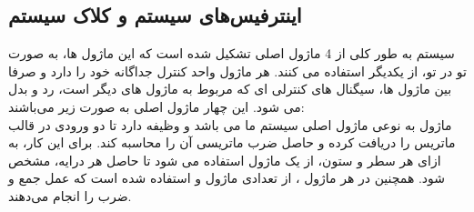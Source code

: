 \documentclass[12pt,titlepage,a4page , tikz , multi,table , svgnames,xcdraw]{article}
\begin{document}
\subsection{اینترفیس‌های سیستم و کلاک سیستم}
سیستم به طور کلی از 4 ماژول اصلی تشکیل شده است که این ماژول ها، به صورت تو در تو، از یکدیگر استفاده می کنند. هر ماژول واحد کنترل جداگانه خود را دارد و صرفا بین ماژول ها، سیگنال های کنترلی ای که مربوط به ماژول های دیگر است، رد و بدل می شود. این چهار ماژول اصلی به صورت زیر می‌باشند: \\ 
ماژول 
 به نوعی ماژول اصلی سیستم ما می باشد و وظیفه دارد تا دو ورودی در قالب ماتریس را دریافت کرده و حاصل ضرب ماتریسی آن را محاسبه کند. برای این کار، به ازای هر سطر و ستون، از یک ماژول 
  استفاده می شود تا حاصل هر درایه، مشخص شود. همچنین در هر ماژول 
، از تعدادی ماژول 
 و 
 استفاده شده است که عمل جمع و ضرب 
 را انجام می‌دهند.
	
\end{document}
